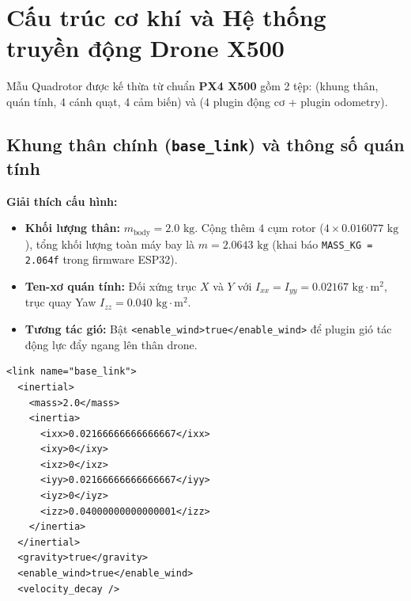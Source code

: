 \documentclass[11pt,a4paper]{article}
\begin{document}
\section{Cấu trúc cơ khí và Hệ thống truyền động Drone X500}

Mẫu Quadrotor được kế thừa từ chuẩn \textbf{PX4 X500} gồm 2 tệp:  (khung thân, quán tính, 4 cánh quạt, 4 cảm biến) và  (4 plugin động cơ + plugin odometry).

\subsection{Khung thân chính (\texttt{base\_link}) và thông số quán tính}
\noindent
\begin{minipage}[t]{0.45\textwidth}
\vspace{0pt}
\textbf{Giải thích cấu hình:}
\begin{itemize}
    \item \textbf{Khối lượng thân:} $m_{\text{body}} = 2.0\text{ kg}$. Cộng thêm $4$ cụm rotor ($4 \times 0.016077\text{ kg}$), tổng khối lượng toàn máy bay là $m = 2.0643\text{ kg}$ (khai báo \texttt{MASS\_KG = 2.064f} trong firmware ESP32).
    \item \textbf{Ten-xơ quán tính:} Đối xứng trục $X$ và $Y$ với $I_{xx} = I_{yy} = 0.02167\text{ kg}\cdot\text{m}^2$, trục quay Yaw $I_{zz} = 0.040\text{ kg}\cdot\text{m}^2$.
    \item \textbf{Tương tác gió:} Bật \texttt{<enable\_wind>true</enable\_wind>} để plugin gió tác động lực đẩy ngang lên thân drone.
\end{itemize}
\end{minipage}
\hfill
\begin{minipage}[t]{0.52\textwidth}
\vspace{0pt}
\begin{lstlisting}[language=SDF, firstnumber=7]
<link name="base_link">
  <inertial>
    <mass>2.0</mass>
    <inertia>
      <ixx>0.02166666666666667</ixx>
      <ixy>0</ixy>
      <ixz>0</ixz>
      <iyy>0.02166666666666667</iyy>
      <iyz>0</iyz>
      <izz>0.04000000000000001</izz>
    </inertia>
  </inertial>
  <gravity>true</gravity>
  <enable_wind>true</enable_wind>
  <velocity_decay />
\end{lstlisting}
\end{minipage}
\end{document}
